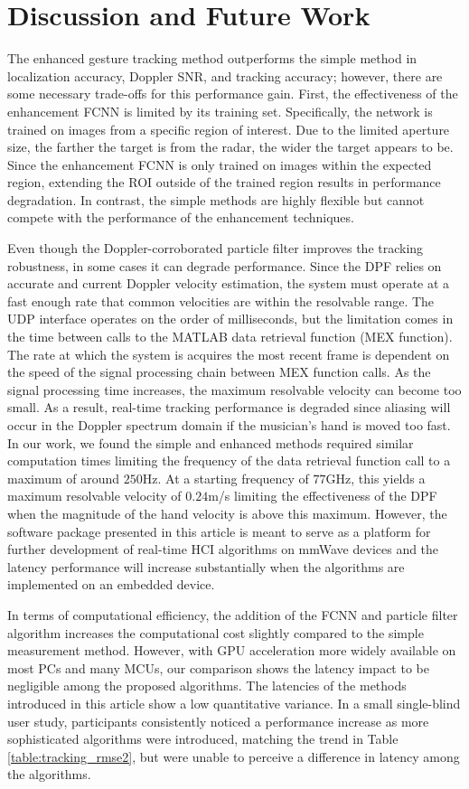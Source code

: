 \documentclass[10pt,journal,final]{IEEEtran}
\begin{document}
\section{Discussion and Future Work}
\label{sec:discussion}
The enhanced gesture tracking method outperforms the simple method in localization accuracy, Doppler SNR, and tracking accuracy; however, there are some necessary trade-offs for this performance gain. First, the effectiveness of the enhancement FCNN is limited by its training set. Specifically, the network is trained on images from a specific region of interest. Due to the limited aperture size, the farther the target is from the radar, the wider the target appears to be. Since the enhancement FCNN is only trained on images within the expected region, extending the ROI outside of the trained region results in performance degradation. In contrast, the simple methods are highly flexible but cannot compete with the performance of the enhancement techniques.

Even though the Doppler-corroborated particle filter improves the tracking robustness, in some cases it can degrade performance. Since the DPF relies on accurate and current Doppler velocity estimation, the system must operate at a fast enough rate that common velocities are within the resolvable range. The UDP interface operates on the order of milliseconds, but the limitation comes in the time between calls to the MATLAB data retrieval function (MEX function). The rate at which the system is acquires the most recent frame is dependent on the speed of the signal processing chain between MEX function calls. As the signal processing time increases, the maximum resolvable velocity can become too small. As a result, real-time tracking performance is degraded since aliasing will occur in the Doppler spectrum domain if the musician's hand is moved too fast. In our work, we found the simple and enhanced methods required similar computation times limiting the frequency of the data retrieval function call to a maximum of around $250$Hz. At a starting frequency of $77$GHz, this yields a maximum resolvable velocity of $0.24$m/s limiting the effectiveness of the DPF when the magnitude of the hand velocity is above this maximum. However, the software package presented in this article is meant to serve as a platform for further development of real-time HCI algorithms on mmWave devices and the latency performance will increase substantially when the algorithms are implemented on an embedded device.

In terms of computational efficiency, the addition of the FCNN and particle filter algorithm increases the computational cost slightly compared to the simple measurement method. However, with GPU acceleration more widely available on most PCs and many MCUs, our comparison shows the latency impact to be negligible among the proposed algorithms. The latencies of the methods introduced in this article show a low quantitative variance. In a small single-blind user study, participants consistently noticed a performance increase as more sophisticated algorithms were introduced, matching the trend in Table \ref{table:tracking_rmse2}, but were unable to perceive a difference in latency among the algorithms.
\end{document}
